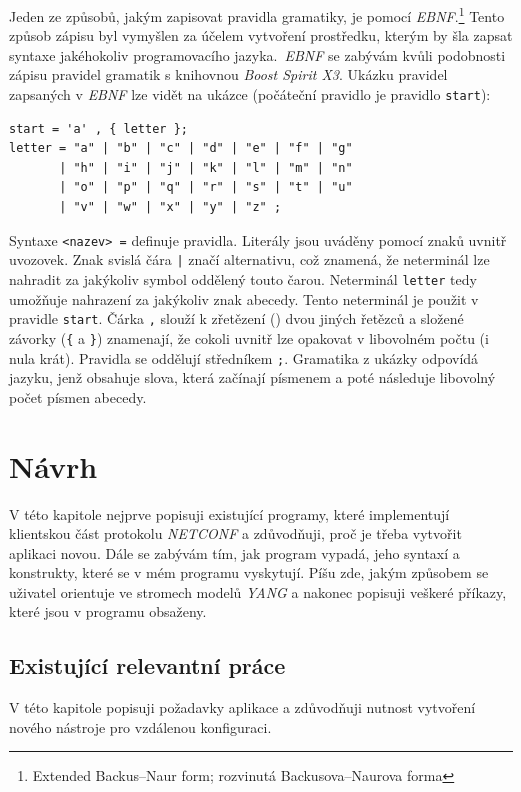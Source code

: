\documentclass[thesis=B,czech,hidelinks]{FITthesis}[2019/03/06]
\begin{document}
Jeden ze způsobů, jakým zapisovat pravidla gramatiky, je pomocí \textit{EBNF}.\footnote{Extended Backus--Naur form; rozvinutá Backusova--Naurova forma} Tento způsob zápisu byl vymyšlen za účelem vytvoření prostředku, kterým by šla zapsat syntaxe jakéhokoliv programovacího jazyka.\,\cite{ebnf-cmu} \textit{EBNF} se zabývám kvůli podobnosti zápisu pravidel gramatik s knihovnou \textit{Boost Spirit X3}. Ukázku pravidel zapsaných v \textit{EBNF} lze vidět na ukázce (počáteční pravidlo je pravidlo \texttt{start}):
\begin{verbatim}
start = 'a' , { letter };
letter = "a" | "b" | "c" | "d" | "e" | "f" | "g"
       | "h" | "i" | "j" | "k" | "l" | "m" | "n"
       | "o" | "p" | "q" | "r" | "s" | "t" | "u"
       | "v" | "w" | "x" | "y" | "z" ;
\end{verbatim}
Syntaxe \verb¨<nazev> =¨ definuje pravidla. Literály jsou uváděny pomocí znaků uvnitř uvozovek. Znak svislá čára \texttt{|} značí alternativu, což znamená, že neterminál lze nahradit za jakýkoliv symbol oddělený touto čarou. Neterminál \texttt{letter} tedy umožňuje nahrazení za jakýkoliv znak abecedy. Tento neterminál je použit v pravidle \texttt{start}. Čárka \texttt{,} slouží k zřetězení () dvou jiných řetězců a složené závorky (\texttt{\{} a \texttt{\}}) znamenají, že cokoli uvnitř lze opakovat v libovolném počtu (i nula krát). Pravidla se oddělují středníkem \texttt{;}. Gramatika z ukázky odpovídá jazyku, jenž obsahuje slova, která začínají písmenem  a poté následuje libovolný počet písmen abecedy.



\chapter{Návrh}
V této kapitole nejprve popisuji existující programy, které implementují klientskou část protokolu \textit{NETCONF} a zdůvodňuji, proč je třeba vytvořit aplikaci novou. Dále se zabývám tím, jak program vypadá, jeho syntaxí a konstrukty, které se v mém programu vyskytují. Píšu zde, jakým způsobem se uživatel orientuje ve stromech modelů \textit{YANG} a nakonec popisuji veškeré příkazy, které jsou v programu obsaženy.

\section{Existující relevantní práce}\label{existing}
V této kapitole popisuji požadavky aplikace a zdůvodňuji nutnost vytvoření nového nástroje pro vzdálenou konfiguraci.
\end{document}

